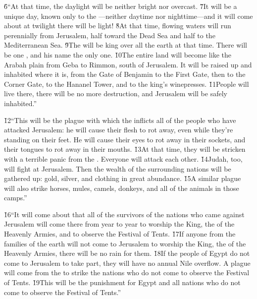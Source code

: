 \v{6}``At that time, the daylight will be neither bright nor overcast. \v{7}It will be a unique day, known only to the ---neither daytime nor nighttime---and it will come about at twilight there will be light! \v{8}At that time, flowing waters will run perennially from Jerusalem, half toward the Dead Sea and half to the Mediterranean Sea. \v{9}The  will be king over all the earth at that time. There will be one , and his name the only one. \v{10}The entire land will become like the Arabah plain from Geba to Rimmon, south of Jerusalem. It will be raised up and inhabited where it is, from the Gate of Benjamin to the First Gate, then to the Corner Gate, to the Hananel Tower, and to the king's winepresses. \v{11}People will live there, there will be no more destruction, and Jerusalem will be safely inhabited.''

\v{12}``This will be the plague with which the  inflicts all of the people who have attacked Jerusalem: he will cause their flesh to rot away, even while they're standing on their feet. He will cause their eyes to rot away in their sockets, and their tongues to rot away in their mouths. \v{13}At that time, they will be stricken with a terrible panic from the . Everyone will attack each other. \v{14}Judah, too, will fight at Jerusalem. Then the wealth of the surrounding nations will be gathered up: gold, silver, and clothing in great abundance. \v{15}A similar plague will also strike horses, mules, camels, donkeys, and all of the animals in those camps.''

\v{16}``It will come about that all of the survivors of the nations who came against Jerusalem will come there from year to year to worship the King, the  of the Heavenly Armies, and to observe the Festival of Tents. \v{17}If anyone from the families of the earth will not come to Jerusalem to worship the King, the  of the Heavenly Armies, there will be no rain for them. \v{18}If the people of Egypt do not come to Jerusalem to take part, they will have no annual Nile overflow. A plague will come from the  to strike the nations who do not come to observe the Festival of Tents. \v{19}This will be the punishment for Egypt and all nations who do not come to observe the Festival of Tents.''


